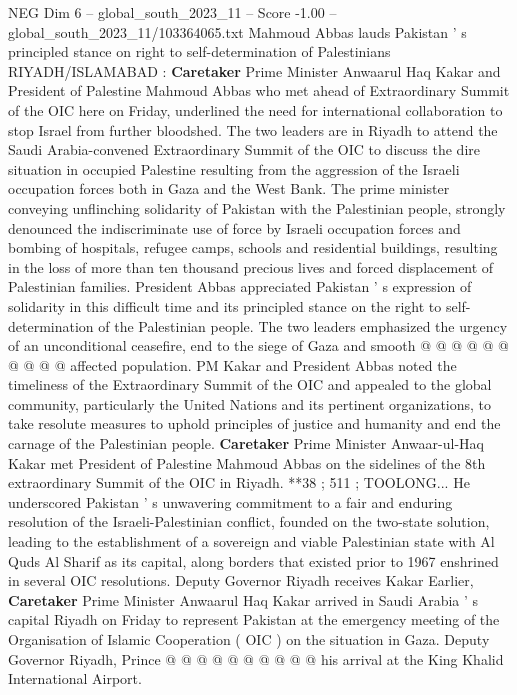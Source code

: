 \begin{textsample}{NEG Dim 6 – global\_south\_2023\_11 – Score -1.00 – global\_south\_2023\_11/103364065.txt}  \label{ex:f6_neg_186}
Mahmoud Abbas lauds Pakistan ' s principled stance on right to self-determination of Palestinians RIYADH/ISLAMABAD : \textbf{Caretaker} Prime Minister Anwaarul Haq Kakar and President of Palestine Mahmoud Abbas who met ahead of Extraordinary Summit of the OIC here on Friday, underlined the need for international collaboration to stop Israel from further bloodshed.
The two leaders are in Riyadh to attend the Saudi Arabia-convened Extraordinary Summit of the OIC to discuss the dire situation in occupied Palestine resulting from the aggression of the Israeli occupation forces both in Gaza and the West Bank.
The prime minister conveying unflinching solidarity of Pakistan with the Palestinian people, strongly denounced the indiscriminate use of force by Israeli occupation forces and bombing of hospitals, refugee camps, schools and residential buildings, resulting in the loss of more than ten thousand precious lives and forced displacement of Palestinian families.
President Abbas appreciated Pakistan ' s expression of solidarity in this difficult time and its principled stance on the right to self-determination of the Palestinian people.
The two leaders emphasized the urgency of an unconditional ceasefire, end to the siege of Gaza and smooth @ @ @ @ @ @ @ @ @ @ affected population.
PM Kakar and President Abbas noted the timeliness of the Extraordinary Summit of the OIC and appealed to the global community, particularly the United Nations and its pertinent organizations, to take resolute measures to uphold principles of justice and humanity and end the carnage of the Palestinian people. \textbf{Caretaker} Prime Minister Anwaar-ul-Haq Kakar met President of Palestine Mahmoud Abbas on the sidelines of the 8th extraordinary Summit of the OIC in Riyadh. **38 ; 511 ; TOOLONG...
He underscored Pakistan ' s unwavering commitment to a fair and enduring resolution of the Israeli-Palestinian conflict, founded on the two-state solution, leading to the establishment of a sovereign and viable Palestinian state with Al Quds Al Sharif as its capital, along borders that existed prior to 1967 enshrined in several OIC resolutions.
Deputy Governor Riyadh receives Kakar Earlier, \textbf{Caretaker} Prime Minister Anwaarul Haq Kakar arrived in Saudi Arabia ' s capital Riyadh on Friday to represent Pakistan at the emergency meeting of the Organisation of Islamic Cooperation ( OIC ) on the situation in Gaza.
Deputy Governor Riyadh, Prince @ @ @ @ @ @ @ @ @ @ his arrival at the King Khalid International Airport.

\end{textsample}

